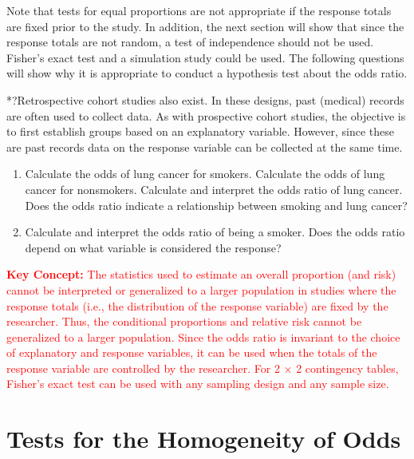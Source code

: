 \documentclass[
]{report}
\providecommand{\tightlist}{%
  \setlength{\itemsep}{0pt}\setlength{\parskip}{0pt}}
\begin{document}
Note that tests for equal proportions are not appropriate if the response totals are fixed prior to the study. In addition, the next section will show that since the response totals are not random, a test of independence should not be used. Fisher's exact test and a simulation study could be used. The following questions will show why it is appropriate to conduct a hypothesis test about the odds ratio.

*?Retrospective cohort studies also exist. In these designs, past (medical) records are often used to collect data. As with prospective cohort studies, the objective is to first establish groups based on an explanatory variable. However, since these are past records data on the response variable can be collected at the same time.

\begin{enumerate}
\def\labelenumi{\arabic{enumi}.}
\setcounter{enumi}{29}
\tightlist
\item
  Calculate the odds of lung cancer for smokers. Calculate the odds of lung cancer for nonsmokers. Calculate and interpret the odds ratio of lung cancer. Does the odds ratio indicate a relationship between smoking and lung cancer?\\
\item
  Calculate and interpret the odds ratio of being a smoker. Does the odds ratio depend on what variable is considered the response?
\end{enumerate}

\Large

\textbf{\textcolor{red}{Key Concept:}}
\textcolor{red}{The statistics used to estimate an overall proportion (and risk) cannot be interpreted or generalized to a larger population in studies where the response totals (i.e., the distribution of the response variable) are fixed by the researcher. Thus, the conditional proportions and relative risk cannot be generalized to a larger population. Since the odds ratio is invariant to the choice of explanatory and response variables, it can be used when the totals of the response variable are controlled by the researcher. For 2 × 2 contingency tables, Fisher’s exact test can be used with any sampling design and any sample size.}
\normalsize

\section*{Tests for the Homogeneity of Odds}\label{tests-for-the-homogeneity-of-odds}
\end{document}

